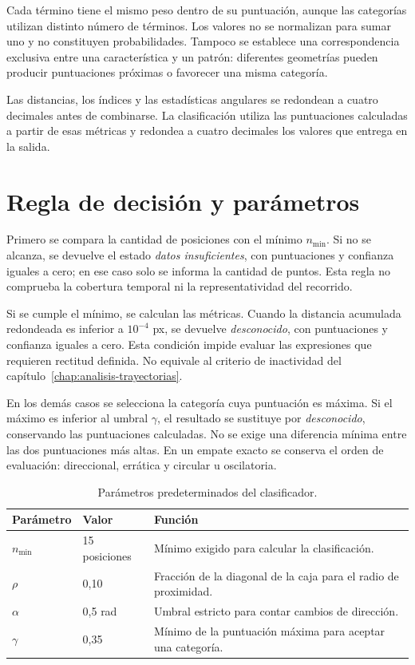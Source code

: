 Cada término tiene el mismo peso dentro de su puntuación, aunque las categorías utilizan distinto número de términos. Los valores no se normalizan para sumar uno y no constituyen probabilidades. Tampoco se establece una correspondencia exclusiva entre una característica y un patrón: diferentes geometrías pueden producir puntuaciones próximas o favorecer una misma categoría.

Las distancias, los índices y las estadísticas angulares se redondean a cuatro decimales antes de combinarse. La clasificación utiliza las puntuaciones calculadas a partir de esas métricas y redondea a cuatro decimales los valores que entrega en la salida.

\section{Regla de decisión y parámetros}

Primero se compara la cantidad de posiciones con el mínimo $n_{\min}$. Si no se alcanza, se devuelve el estado \textit{datos insuficientes}, con puntuaciones y confianza iguales a cero; en ese caso solo se informa la cantidad de puntos. Esta regla no comprueba la cobertura temporal ni la representatividad del recorrido.

Si se cumple el mínimo, se calculan las métricas. Cuando la distancia acumulada redondeada es inferior a $10^{-4}$ px, se devuelve \textit{desconocido}, con puntuaciones y confianza iguales a cero. Esta condición impide evaluar las expresiones que requieren rectitud definida. No equivale al criterio de inactividad del capítulo~\ref{chap:analisis-trayectorias}.

En los demás casos se selecciona la categoría cuya puntuación es máxima. Si el máximo es inferior al umbral $\gamma$, el resultado se sustituye por \textit{desconocido}, conservando las puntuaciones calculadas. No se exige una diferencia mínima entre las dos puntuaciones más altas. En un empate exacto se conserva el orden de evaluación: direccional, errática y circular u oscilatoria.

\begin{table}[htbp]
 \centering
 \caption{Parámetros predeterminados del clasificador.}
 \label{tab:parametros-clasificacion}
 \begin{tabularx}{\textwidth}{@{}l l X@{}}
  \toprule
  Parámetro & Valor & Función \\
  \midrule
  $n_{\min}$ & 15 posiciones & Mínimo exigido para calcular la clasificación. \\
  $\rho$ & 0,10 & Fracción de la diagonal de la caja para el radio de proximidad. \\
  $\alpha$ & 0,5 rad & Umbral estricto para contar cambios de dirección. \\
  $\gamma$ & 0,35 & Mínimo de la puntuación máxima para aceptar una categoría. \\
  \bottomrule
 \end{tabularx}
\end{table}

